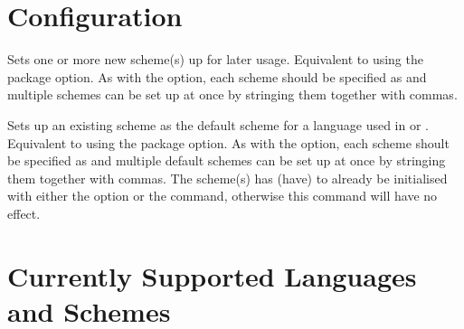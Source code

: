 \documentclass{ltxdockit}
\begin{document}
\section{Configuration}

\begin{ltxsyntax}

  Sets one or more new scheme(s) up for later usage. Equivalent to using the
   package option. As with the option, each scheme should be specified as
   and multiple schemes can be set up at once by
  stringing them together with commas.


  Sets up an existing scheme as the default scheme for a language used in
   or . Equivalent
  to using the  package option. As with the option, each
  scheme shoult be specified as  and multiple
  default schemes can be set up at once by stringing them together with commas.
  The scheme(s) has (have) to already be initialised with either the
   option or the  command,
  otherwise this command will have no effect.
\end{ltxsyntax}

\section{Currently Supported Languages and Schemes}
\end{document}
